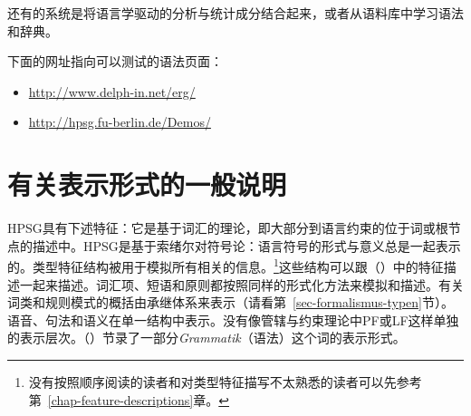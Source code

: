 还有的系统是将语言学驱动的分析与统计成分结合起来\citep{Brew95a,MNT2005a-u,MT2008a-u}，或者从语料库中学习语法和辞典\citep{Fouvry2003a-u,CZ2009a-u}。

下面的网址指向可以测试的语法页面：
\begin{itemize}
\item \url{http://www.delph-in.net/erg/}
\item \url{http://hpsg.fu-berlin.de/Demos/}
\end{itemize}


\section{有关表示形式的一般说明}

HPSG具有下述特征：它是基于词汇的理论，即大部分到语言约束的位于词或根节点的描述中。HPSG是基于索绪尔对符号论：语言符号的形式与意义总是一起表示的。类型特征结构被用于模拟所有相关的信息。\footnote{没有按照顺序阅读的读者和对类型特征描写不太熟悉的读者可以先参考第~\ref{chap-feature-descriptions}章。
}这些结构可以跟（）中的特征描述一起来描述。词汇项、短语和原则都按照同样的形式化方法来模拟和描述。有关词类和规则模式的概括由承继体系来表示（请看第~\ref{sec-formalismus-typen}节）。语音、句法和语义在单一结构中表示。没有像管辖与约束理论中PF或LF这样单独的表示层次。（）节录了一部分\emph{Grammatik}（语法）这个词的表示形式。

